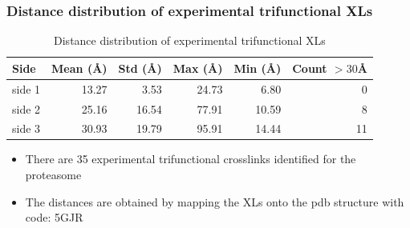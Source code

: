 \documentclass[a4paper,8pt]{beamer}
\begin{document}
\begin{frame}
  \frametitle{Distance distribution of experimental trifunctional XLs}
  \centering
  \begin{table}
    \centering
    \caption{Distance distribution of experimental trifunctional XLs}
  \begin{tabular}{lrrrrr}
    \toprule
    Side & Mean ({\AA}) & Std ({\AA}) & Max ({\AA}) & Min ({\AA}) & Count $> 30${\AA} \\
    \midrule
    side 1 & 13.27 & 3.53 & 24.73 & 6.80 & 0 \\
    side 2 & 25.16 & 16.54 & 77.91 & 10.59 & 8 \\
    side 3 & 30.93 & 19.79 & 95.91 & 14.44 & 11 \\
    \bottomrule
    \end{tabular}   
  \end{table} 
  \begin{block}
    {}
    \begin{itemize}
      \item There are 35 experimental trifunctional crosslinks identified for the proteasome
      \item The distances are obtained by mapping the XLs onto the pdb structure with code: 5GJR
    \end{itemize}
    \end{block}
\end{frame}
%
\end{document}
